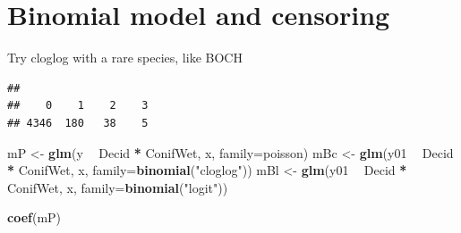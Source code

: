 \documentclass[12pt,]{book}
\newenvironment{Shaded}{\begin{snugshade}}{\end{snugshade}}
\newcommand{\CommentTok}[1]{\textcolor[rgb]{0.56,0.35,0.01}{\textit{#1}}}
\newcommand{\DataTypeTok}[1]{\textcolor[rgb]{0.13,0.29,0.53}{#1}}
\newcommand{\DecValTok}[1]{\textcolor[rgb]{0.00,0.00,0.81}{#1}}
\newcommand{\KeywordTok}[1]{\textcolor[rgb]{0.13,0.29,0.53}{\textbf{#1}}}
\newcommand{\NormalTok}[1]{#1}
\newcommand{\OperatorTok}[1]{\textcolor[rgb]{0.81,0.36,0.00}{\textbf{#1}}}
\newcommand{\StringTok}[1]{\textcolor[rgb]{0.31,0.60,0.02}{#1}}
\begin{document}
\hypertarget{binomial-model-and-censoring}{%
\section{Binomial model and censoring}\label{binomial-model-and-censoring}}

Try cloglog with a rare species, like BOCH

\begin{Shaded}
\end{Shaded}

\begin{verbatim}
## 
##    0    1    2    3 
## 4346  180   38    5
\end{verbatim}

\begin{Shaded}
\begin{Highlighting}[]
\NormalTok{mP <-}\StringTok{ }\KeywordTok{glm}\NormalTok{(y }\OperatorTok{~}\StringTok{ }\NormalTok{Decid }\OperatorTok{*}\StringTok{ }\NormalTok{ConifWet, x, }\DataTypeTok{family=}\NormalTok{poisson)}
\NormalTok{mBc <-}\StringTok{ }\KeywordTok{glm}\NormalTok{(y01 }\OperatorTok{~}\StringTok{ }\NormalTok{Decid }\OperatorTok{*}\StringTok{ }\NormalTok{ConifWet, x, }\DataTypeTok{family=}\KeywordTok{binomial}\NormalTok{(}\StringTok{"cloglog"}\NormalTok{))}
\NormalTok{mBl <-}\StringTok{ }\KeywordTok{glm}\NormalTok{(y01 }\OperatorTok{~}\StringTok{ }\NormalTok{Decid }\OperatorTok{*}\StringTok{ }\NormalTok{ConifWet, x, }\DataTypeTok{family=}\KeywordTok{binomial}\NormalTok{(}\StringTok{"logit"}\NormalTok{))}

\KeywordTok{coef}\NormalTok{(mP)}
\end{Highlighting}
\end{Shaded}
\end{document}

